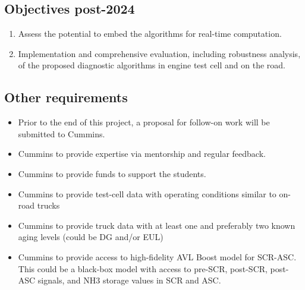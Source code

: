 \subsection{Objectives post-2024}
\begin{enumerate}
    \item Assess the potential to embed the algorithms for real-time computation.
    \item Implementation and comprehensive evaluation, including robustness analysis, of the proposed diagnostic algorithms in engine test cell and on the road.
\end{enumerate}


\subsection{Other requirements}
\begin{itemize}
    \item Prior to the end of this project, a proposal for follow-on work will be submitted to Cummins.
    \item Cummins to provide expertise via mentorship and regular feedback.
    \item Cummins to provide funds to support the students.
    \item Cummins to provide test-cell data with operating conditions similar to on-road trucks
    \item Cummins to provide truck data with at least one and preferably two known aging levels (could be DG and/or EUL)
    \item Cummins to provide access to high-fidelity AVL Boost model for SCR-ASC. This could be a black-box model with access to pre-SCR, post-SCR, post-ASC signals, and NH3 storage values in SCR and ASC.
\end{itemize}
